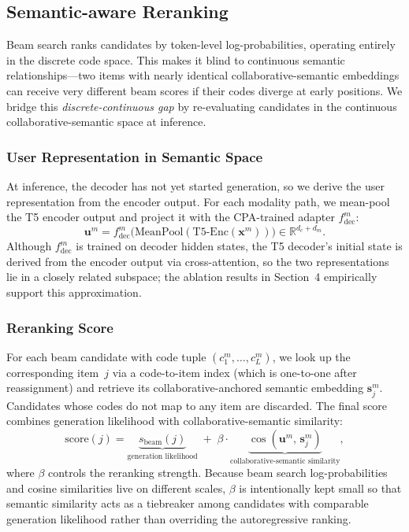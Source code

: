 \documentclass[sigconf, anonymous, review]{acmart}
\begin{document}
\subsection{Semantic-aware Reranking}
\label{sec:rerank}

Beam search ranks candidates by token-level log-probabilities, operating entirely in the discrete code space.
% 
This makes it blind to continuous semantic relationships---two items with nearly identical collaborative-semantic embeddings can receive very different beam scores if their codes diverge at early positions.
% 
We bridge this \emph{discrete-continuous gap} by re-evaluating candidates in the continuous collaborative-semantic space at inference.

\subsubsection{User Representation in Semantic Space}

At inference, the decoder has not yet started generation, so we derive the user representation from the encoder output.
%
For each modality path, we mean-pool the T5 encoder output and project it with the CPA-trained adapter $f_{\text{dec}}^m$:
\begin{equation}
    \mathbf{u}^m = f_{\text{dec}}^m\!\bigl(\mathrm{MeanPool}(\mathrm{T5\text{-}Enc}(\mathbf{x}^m))\bigr) \in \mathbb{R}^{d_c+d_m}.
\end{equation}
Although $f_{\text{dec}}^m$ is trained on decoder hidden states, the T5 decoder's initial state is derived from the encoder output via cross-attention, so the two representations lie in a closely related subspace; the ablation results in Section~4 empirically support this approximation.

\subsubsection{Reranking Score}

For each beam candidate with code tuple $(c_1^m, \ldots, c_L^m)$, we look up the corresponding item~$j$ via a code-to-item index (which is one-to-one after reassignment) and retrieve its collaborative-anchored semantic embedding $\mathbf{s}_j^m$.
%
Candidates whose codes do not map to any item are discarded.
% 
The final score combines generation likelihood with collaborative-semantic similarity:
\begin{equation}
    \mathrm{score}(j) = \underbrace{s_{\text{beam}}(j)}_{\text{generation likelihood}} \;+\; \beta\cdot\underbrace{\cos(\mathbf{u}^m,\, \mathbf{s}_j^m)}_{\text{collaborative-semantic similarity}},
    \label{eq:rerank}
\end{equation}
where $\beta$ controls the reranking strength.
%
Because beam search log-probabilities and cosine similarities live on different scales, $\beta$ is intentionally kept small so that semantic similarity acts as a tiebreaker among candidates with comparable generation likelihood rather than overriding the autoregressive ranking.
\end{document}
